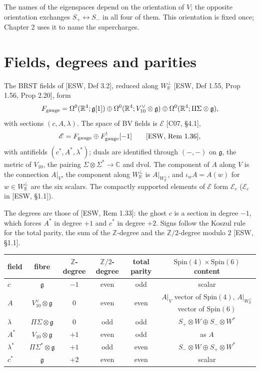 \begin{remark}
The names of the eigenspaces depend on the orientation of $V$; the opposite orientation exchanges $S_+\leftrightarrow S_-$ in all four of them. This orientation is fixed once; Chapter 2 uses it to name the supercharges.
\end{remark}

\section{Fields, degrees and parities}

\begin{definition}[Fields]
\label{def:c1-fields}
The BRST fields of [ESW, Def 3.2], reduced along $W_{\mathbb R}^\perp$ [ESW, Def 1.55, Prop 1.56, Prop 2.20], form
\[
F_{\rm gauge}=\Omega^0(\mathbb R^4;\mathfrak g[1])\oplus\Omega^0(\mathbb R^4;V_{10}^\vee\otimes\mathfrak g)\oplus\Omega^0(\mathbb R^4;\Pi\Sigma\otimes\mathfrak g),
\]
with sections $(c,A,\lambda)$. The space of BV fields is $\mathscr E$ [C07, §4.1],
\[
\mathscr E=F_{\rm gauge}\oplus F_{\rm gauge}^![-1]\qquad[\text{ESW, Rem 1.36}],
\]
with antifields $(c^*,A^*,\lambda^*)$; duals are identified through $(-,-)$ on $\mathfrak g$, the metric of $V_{10}$, the pairing $\Sigma\otimes\Sigma^*\to\mathbb C$ and $\mathrm{dvol}$. The component of $A$ along $V$ is the connection $A|_V$, the component along $W_{\mathbb R}^\perp$ is $A|_{W_{\mathbb R}^\perp}$, and $\iota_wA=A(w)$ for $w\in W_{\mathbb R}^\perp$ are the six scalars. The compactly supported elements of $\mathscr E$ form $\mathscr E_c$ ($\mathcal E_c$ in [ESW, §1.1]).
\end{definition}

The degrees are those of [ESW, Rem 1.33]: the ghost $c$ is a section in degree $-1$, which forces $A^*$ in degree $+1$ and $c^*$ in degree $+2$. Signs follow the Koszul rule for the total parity, the sum of the $\mathbb Z$-degree and the $\mathbb Z/2$-degree modulo $2$ [ESW, §1.1].

\begin{tabular}{l|c|c|c|c|c}
field & fibre & $\mathbb Z$-degree & $\mathbb Z/2$-degree & total parity & $\mathrm{Spin}(4)\times\mathrm{Spin}(6)$ content \\
\hline
$c$ & $\mathfrak g$ & $-1$ & even & odd & scalar \\
$A$ & $V_{10}^\vee\otimes\mathfrak g$ & $0$ & even & even & $A|_V$ vector of $\mathrm{Spin}(4)$, $A|_{W_{\mathbb R}^\perp}$ vector of $\mathrm{Spin}(6)$ \\
$\lambda$ & $\Pi\Sigma\otimes\mathfrak g$ & $0$ & odd & odd & $S_+\otimes W\oplus S_-\otimes W^*$ \\
$A^*$ & $V_{10}\otimes\mathfrak g$ & $+1$ & even & odd & as $A$ \\
$\lambda^*$ & $\Pi\Sigma^*\otimes\mathfrak g$ & $+1$ & odd & even & $S_-\otimes W\oplus S_+\otimes W^*$ \\
$c^*$ & $\mathfrak g$ & $+2$ & even & even & scalar \\
\end{tabular}

